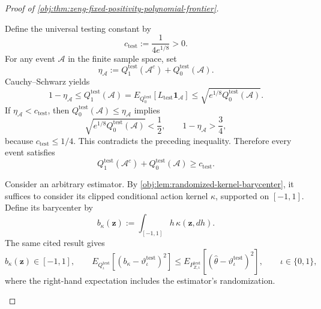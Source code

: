 \documentclass[11pt]{article}
\begin{document}
\begin{proof}[Proof of \cref{obj:thm:zeng-fixed-positivity-polynomial-frontier}]
\begin{enumerate}
Define the universal testing constant by
\[
c_{\mathrm{test}}:=\frac1{4e^{1/8}}>0.
\]
For any event \(\mathcal A\) in the finite sample space, set
\[
\eta_{\mathcal A}
:=
Q^{\mathrm{test}}_1(\mathcal A^c)
+
Q^{\mathrm{test}}_0(\mathcal A).
\]
Cauchy--Schwarz yields
\[
1-\eta_{\mathcal A}
\le Q^{\mathrm{test}}_1(\mathcal A)
=
E_{Q^{\mathrm{test}}_0}
[L_{\mathrm{test}}\mathbf1_{\mathcal A}]
\le
\sqrt{e^{1/8}Q^{\mathrm{test}}_0(\mathcal A)}.
\]
If \(\eta_{\mathcal A}<c_{\mathrm{test}}\), then
\(Q^{\mathrm{test}}_0(\mathcal A)\le\eta_{\mathcal A}\) implies
\[
\sqrt{e^{1/8}Q^{\mathrm{test}}_0(\mathcal A)}
<\frac12,
\qquad
1-\eta_{\mathcal A}>\frac34,
\]
because \(c_{\mathrm{test}}\le1/4\). This contradicts the preceding
inequality. Therefore every event satisfies
\[
Q^{\mathrm{test}}_1(\mathcal A^c)
+
Q^{\mathrm{test}}_0(\mathcal A)
\ge c_{\mathrm{test}}.
\]

Consider an arbitrary estimator. By
\cref{obj:lem:randomized-kernel-barycenter}, it suffices to consider its
clipped conditional action kernel \(\kappa\), supported on \([-1,1]\).
Define its barycenter by
\[
b_\kappa(\mathbf z)
:=
\int_{[-1,1]}h\,\kappa(\mathbf z,dh).
\]
The same cited result gives
\[
b_\kappa(\mathbf z)\in[-1,1],
\qquad
E_{Q^{\mathrm{test}}_\iota}
\left[
(b_\kappa-\vartheta^{\mathrm{test}}_\iota)^2
\right]
\le
E_{P^{\mathrm{test}}_{Z,\iota}}
\left[
(\widehat\theta-\vartheta^{\mathrm{test}}_\iota)^2
\right],
\qquad \iota\in\{0,1\},
\]
where the right-hand expectation includes the estimator's
randomization.


\end{enumerate}
\end{proof}
\end{document}
